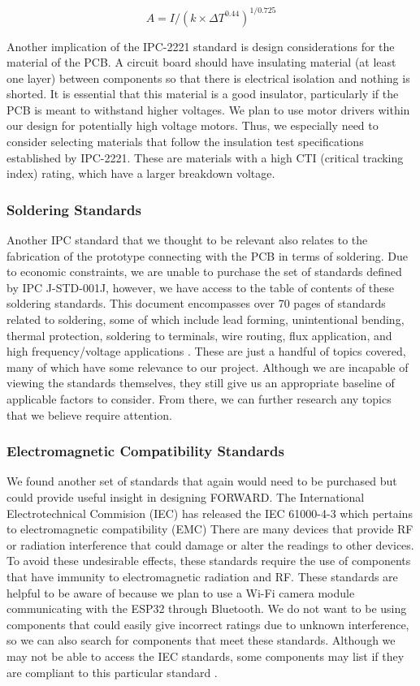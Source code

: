 \noindent \[A = I / ({k \times \Delta T ^ {0.44}}) ^ {1/0.725}\]

\noindent Another implication of the IPC-2221 standard is design considerations for the material of the PCB. A circuit board should have insulating material (at least one layer) between components so that there is electrical isolation and nothing is shorted. It is essential that this material is a good insulator, particularly if the PCB is meant to withstand higher voltages. We plan to use motor drivers within our design for potentially high voltage motors. Thus, we especially need to consider selecting materials that follow the insulation test specifications established by IPC-2221. These are materials with a high CTI (critical tracking index) rating, which have a larger breakdown voltage.\\

\subsubsection{Soldering Standards}
\noindent Another IPC standard that we thought to be relevant also relates to the fabrication of the prototype connecting with the PCB in terms of soldering. Due to economic constraints, we are unable to purchase the set of standards defined by IPC J-STD-001J, however, we have access to the table of contents of these soldering standards. This document encompasses over 70 pages of standards related to soldering, some of which include lead forming, unintentional bending, thermal protection, soldering to terminals, wire routing, flux application, and high frequency/voltage applications \cite{ipc_standard}. These are just a handful of topics covered, many of which have some relevance to our project. Although we are incapable of viewing the standards themselves, they still give us an appropriate baseline of applicable factors to consider. From there, we can further research any topics that we believe require attention.\\

\subsubsection{Electromagnetic Compatibility Standards}
\noindent We found another set of standards that again would need to be purchased but could  provide useful insight in designing FORWARD. The International Electrotechnical Commision (IEC) has released the IEC 61000-4-3 which pertains to electromagnetic compatibility (EMC) There are many devices that provide RF or radiation interference that could damage or alter the readings to other devices. To avoid these undesirable effects, these standards require the use of components that have immunity to electromagnetic radiation and RF. These standards are helpful to be aware of because we plan to use a Wi-Fi camera module communicating with the ESP32 through Bluetooth. We do not want to be using components that could easily give incorrect ratings due to unknown interference, so we can also search for components that meet these standards. Although we may not be able to access the IEC standards, some components may list if they are compliant to this particular standard \cite{iec_standard}.\\

